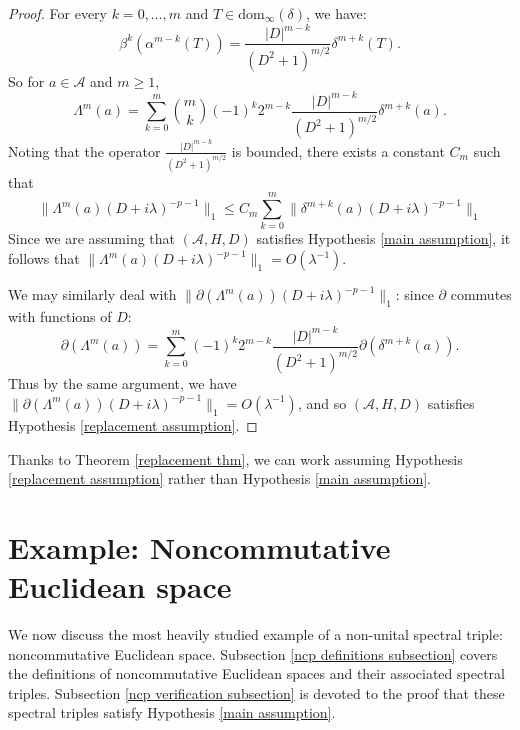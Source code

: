 \begin{proof}
        For every $k = 0,\ldots,m$ and $T \in \mathrm{dom}_\infty(\delta)$, we have:
        \begin{equation*}
            \beta^k(\alpha^{m-k}(T)) = \frac{|D|^{m-k}}{(D^2+1)^{m/2}}\delta^{m+k}(T).
        \end{equation*}
        So for $a \in \mathcal{A}$ and $m \geq 1$,
        \begin{equation*}
            \Lambda^m(a) = \sum_{k=0}^m \binom{m}{k} (-1)^k2^{m-k} \frac{|D|^{m-k}}{(D^2+1)^{m/2}}\delta^{m+k}(a).
        \end{equation*}
        Noting that the operator $\frac{|D|^{m-k}}{(D^2+1)^{m/2}}$ is bounded, there exists a constant $C_m$ such that
        \begin{equation*}
            \|\Lambda^m(a)(D+i\lambda)^{-p-1}\|_1 \leq C_m\sum_{k=0}^m \|\delta^{m+k}(a)(D+i\lambda)^{-p-1}\|_1
        \end{equation*}
        Since we are assuming that $(\mathcal{A},H,D)$ satisfies Hypothesis \ref{main assumption}, it follows
        that $\|\Lambda^m(a)(D+i\lambda)^{-p-1}\|_1 = O(\lambda^{-1})$. 
        
        We may similarly deal with $\|\partial(\Lambda^m(a))(D+i\lambda)^{-p-1}\|_1$: since $\partial$ commutes with functions of $D$:
        \begin{equation*}
            \partial(\Lambda^m(a)) = \sum_{k=0}^m (-1)^k2^{m-k} \frac{|D|^{m-k}}{(D^2+1)^{m/2}}\partial(\delta^{m+k}(a)).
        \end{equation*} 
        Thus by the same argument, we have $\|\partial(\Lambda^m(a))(D+i\lambda)^{-p-1}\|_1 = O(\lambda^{-1})$, and so $(\mathcal{A},H,D)$
        satisfies Hypothesis \ref{replacement assumption}.
    \end{proof}
    
    Thanks to Theorem \ref{replacement thm}, we can work assuming Hypothesis \ref{replacement assumption} rather than Hypothesis \ref{main assumption}.

\section{Example: Noncommutative Euclidean space}\label{nc section}
    We now discuss the most heavily studied example of a non-unital spectral triple: noncommutative Euclidean space. Subsection \ref{ncp definitions subsection} covers
    the definitions of noncommutative Euclidean spaces and their associated spectral triples. Subsection \ref{ncp verification subsection} is devoted to the proof that 
    these spectral triples satisfy Hypothesis \ref{main assumption}.
    
